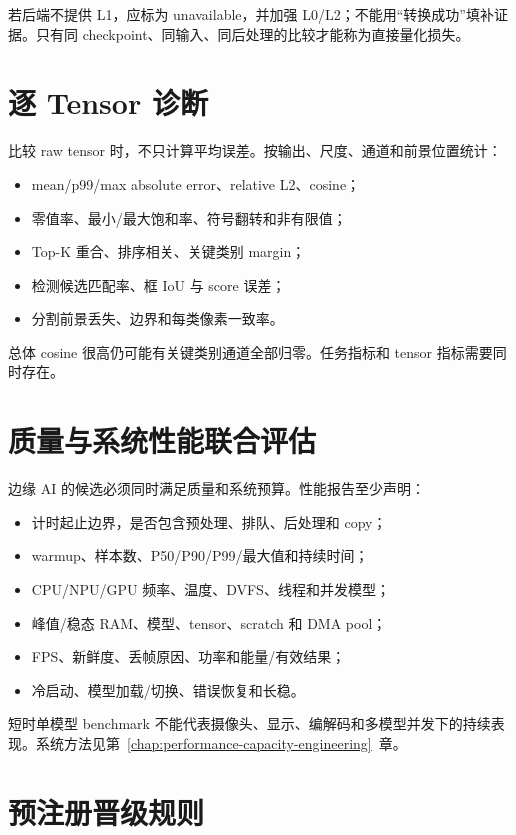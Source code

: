 若后端不提供 L1，应标为 unavailable，并加强 L0/L2；不能用“转换成功”填补证据。只有同 checkpoint、同输入、同后处理的比较才能称为直接量化损失。

\section{逐 Tensor 诊断}

比较 raw tensor 时，不只计算平均误差。按输出、尺度、通道和前景位置统计：

\begin{itemize}
  \item mean/p99/max absolute error、relative L2、cosine；
  \item 零值率、最小/最大饱和率、符号翻转和非有限值；
  \item Top-K 重合、排序相关、关键类别 margin；
  \item 检测候选匹配率、框 IoU 与 score 误差；
  \item 分割前景丢失、边界和每类像素一致率。
\end{itemize}

总体 cosine 很高仍可能有关键类别通道全部归零。任务指标和 tensor 指标需要同时存在。

\section{质量与系统性能联合评估}

边缘 AI 的候选必须同时满足质量和系统预算。性能报告至少声明：

\begin{itemize}
  \item 计时起止边界，是否包含预处理、排队、后处理和 copy；
  \item warmup、样本数、P50/P90/P99/最大值和持续时间；
  \item CPU/NPU/GPU 频率、温度、DVFS、线程和并发模型；
  \item 峰值/稳态 RAM、模型、tensor、scratch 和 DMA pool；
  \item FPS、新鲜度、丢帧原因、功率和能量/有效结果；
  \item 冷启动、模型加载/切换、错误恢复和长稳。
\end{itemize}

短时单模型 benchmark 不能代表摄像头、显示、编解码和多模型并发下的持续表现。系统方法见第~\ref{chap:performance-capacity-engineering}~章。

\section{预注册晋级规则}

